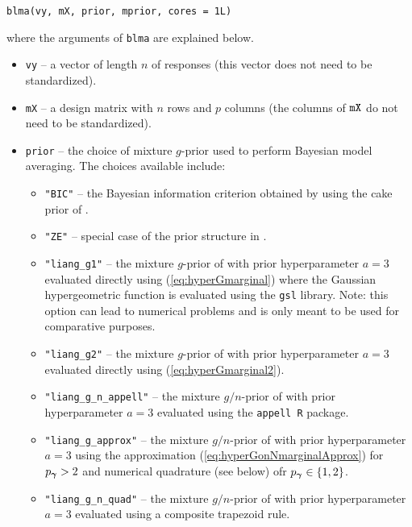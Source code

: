 \begin{verbatim}
blma(vy, mX, prior, mprior, cores = 1L)
\end{verbatim}

\noindent where the arguments of {\tt blma}
are explained below.
\begin{itemize}
	\item {\tt vy} -- a vector of length $n$ of responses (this vector does not need to be standardized).
	
	\item {\tt mX} -- a design matrix with $n$ rows and $p$ columns (the columns of ${\tt mX}$ do not need to be standardized).
	
	\item {\tt prior} -- the choice of mixture $g$-prior used to perform Bayesian model averaging. The choices available include:
	\begin{itemize}
		\item {\tt "BIC"} -- the Bayesian information criterion obtained by using the cake prior 
		of \cite{OrmerodEtal2017}. 
		
		\item {\tt "ZE"} -- special case of the prior structure in \cite{Maruyama2011}.
		
		\item {\tt "liang\_g1"} -- the mixture $g$-prior of \cite{Liang2008} with prior hyperparameter $a=3$
		evaluated directly using (\ref{eq:hyperGmarginal}) where the Gaussian hypergeometric function is evaluated using the {\tt gsl} library. Note: this option can lead to numerical problems and is only meant to be used for comparative purposes.
		
		\item {\tt "liang\_g2"} -- the mixture $g$-prior of \cite{Liang2008} with prior hyperparameter $a=3$
		evaluated directly using (\ref{eq:hyperGmarginal2}).
		
		\item {\tt "liang\_g\_n\_appell"} -- the mixture $g/n$-prior of \cite{Liang2008} with prior hyperparameter $a=3$ evaluated using the {\tt appell R} package.
		
		\item {\tt "liang\_g\_approx"} -- the mixture $g/n$-prior of \cite{Liang2008} with prior hyperparameter $a=3$ using the approximation (\ref{eq:hyperGonNmarginalApprox}) for $p_{\boldsymbol \gamma} >2$ and
		numerical quadrature (see below) ofr $p_{\boldsymbol \gamma}\in \{1,2\}$.
		
		\item {\tt "liang\_g\_n\_quad"} -- the mixture $g/n$-prior of \cite{Liang2008} with prior hyperparameter $a=3$ evaluated using a composite trapezoid rule.
		

\end{itemize}
\end{itemize}
